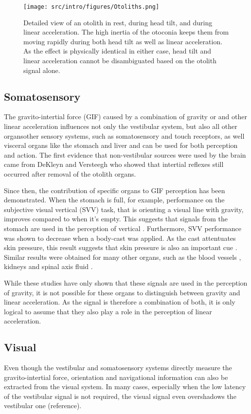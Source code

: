 \begin{figure}
    \texttt{[image: src/intro/figures/Otoliths.png]}
    \caption{Detailed view of an otolith  in rest,  during head tilt, and  during linear acceleration. The high inertia of the otoconia keeps them from moving rapidly during both head tilt as well as linear acceleration. As the effect is physically identical in either case, head tilt and linear acceleration cannot be disambiguated based on the otolith signal alone.}
    \label{intro:fig7}
\end{figure}


\subsection{Somatosensory}
The gravito-intertial force (GIF) caused by a combination of gravity or and other linear acceleration influences not only the vestibular system, but also all other organsother sensory systems, such as somatosensory and touch receptors, as well visceral organs like the stomach and liver  and can be used for both perception and action. The first evidence that non-vestibular sources were used by the brain came from DeKleyn and Versteegh \citeyear{dekleyn1933} who showed that intertial reflexes still occurred after removal of the otolith organs.

Since then, the contribution of specific organs to GIF perception has been demonstrated. When the stomach is full, for example, performance on the subjective visual vertical (SVV) task, that is orienting a visual line with gravity, improves compared to when it's empty. This suggests that signals from the stomach are used in the perception of vertical \cite{trousselard2004}. Furthermore, SVV performance was shown to decrease when a body-cast was applied. As the cast attentuates skin pressure, this result suggests that skin pressure is also an important cue \cite{trousselard2004}. Similar results were obtained for many other organs, such as the blood vessels \cite{vaitl2002}, kidneys and spinal axis fluid \cite{vaitl1997}.

While these studies have only shown that these signals are used in the perception of gravity, it is not possible for these organs to distinguish between gravity and linear acceleration. As the signal is therefore a combination of both, it is only logical to assume that they also play a role in the perception of linear acceleration.

\subsection{Visual}
Even though the vestibular and somatosensory systems directly measure the gravito-intertial force, orientation and navigational information can also be extracted from the visual system. In many cases, especially when the low latency of the vestibular signal is not required, the visual signal even overshadows the vestibular one (reference).

